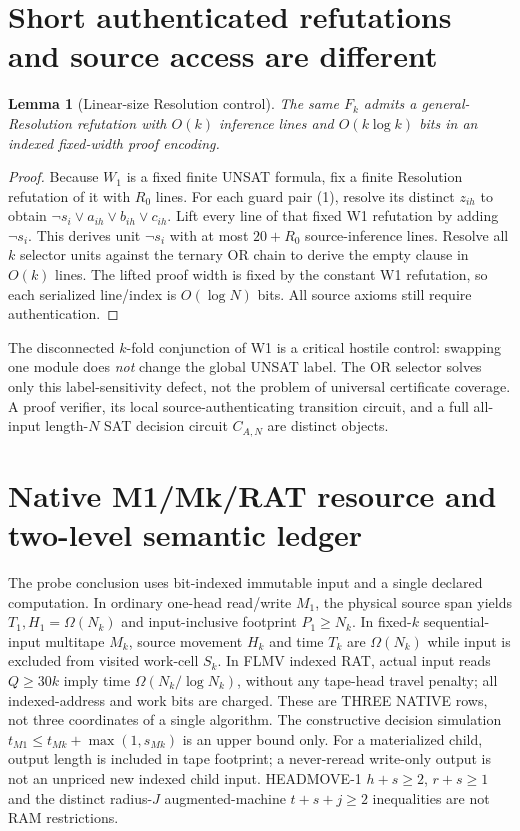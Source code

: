 \documentclass[11pt]{article}
\newtheorem{lemma}[theorem]{Lemma}
\begin{document}
\section{Short authenticated refutations and source access are different}
\begin{lemma}[Linear-size Resolution control]
The same $F_k$ admits a general-Resolution refutation with
$O(k)$ inference lines and $O(k\log k)$ bits in an indexed
fixed-width proof encoding.
\end{lemma}
\begin{proof}
Because $W_1$ is a fixed finite UNSAT formula,
fix a finite Resolution refutation of it with $R_0$ lines.
For each guard pair (1), resolve its distinct $z_{ih}$
to obtain $\neg s_i\vee a_{ih}\vee b_{ih}\vee c_{ih}$.
Lift every line of that fixed W1 refutation by adding
$\neg s_i$. This derives unit $\neg s_i$ with
at most $20+R_0$ source-inference lines.
Resolve all $k$ selector units against the ternary
OR chain to derive the empty clause in $O(k)$ lines.
The lifted proof width is fixed by the constant W1
refutation, so each serialized line/index is $O(\log N)$
bits. All source axioms still require authentication.
\end{proof}
The disconnected $k$-fold conjunction of W1 is a
critical hostile control: swapping one module does
\emph{not} change the global UNSAT label. The OR
selector solves only this label-sensitivity defect,
not the problem of universal certificate coverage.
A proof verifier, its local source-authenticating
transition circuit, and a full all-input length-$N$
SAT decision circuit $C_{A,N}$ are distinct objects.

\section{Native M1/Mk/RAT resource and two-level semantic ledger}
The probe conclusion uses bit-indexed immutable input
and a single declared computation. In ordinary one-head
read/write $M_1$, the physical source span yields
$T_1,H_1=\Omega(N_k)$ and input-inclusive footprint
$P_1\ge N_k$. In fixed-$k$ sequential-input multitape
$M_k$, source movement $H_k$ and time $T_k$ are
$\Omega(N_k)$ while input is excluded from visited
work-cell $S_k$. In FLMV indexed RAT, actual input
reads $Q\ge30k$ imply time $\Omega(N_k/\log N_k)$,
without any tape-head travel penalty; all indexed-address
and work bits are charged. These are THREE NATIVE rows,
not three coordinates of a single algorithm.
The constructive decision simulation
$t_{M1}\le t_{Mk}+\max(1,s_{Mk})$ is an upper bound only.
For a materialized child, output length is included
in tape footprint; a never-reread write-only output
is not an unpriced new indexed child input.
HEADMOVE-1 $h+s\ge2$, $r+s\ge1$ and the distinct
radius-$J$ augmented-machine $t+s+j\ge2$ inequalities
are not RAM restrictions.
\end{document}
